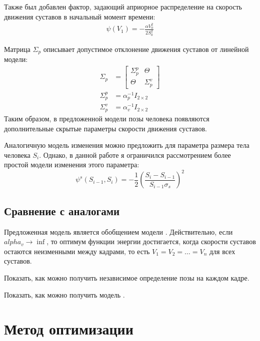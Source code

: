 Также был добавлен фактор, задающий априорное распределение на скорость движения суставов в начальный момент времени:
\begin{equation}
	\begin{aligned}
		\psi(V_1) = -\frac{\alpha V_0^2}{2 S_0^2}
	\end{aligned}
\end{equation}

Матрица $\Sigma_p$ описывает допустимое отклонение движения суставов от линейной модели:
\begin{equation}
	\begin{aligned}
		\Sigma_p &= \left[
			\begin{array}{c|c}
			\Sigma_p^p & \Theta \\ \hline
			\Theta     & \Sigma_p^v
			\end{array}
			\right] \\
		\Sigma_p^p &= \alpha_p^{-1} I_{2\times2} \\
		\Sigma_p^v &= \alpha_v^{-1} I_{2\times2}
	\end{aligned}
\end{equation}
Таким образом, в предложенной модели позы человека появляются дополнительные скрытые параметры скорости движения суставов.

Аналогичную модель изменения можно предложить для параметра размера тела человека $S_i$. Однако, в данной работе я ограничился рассмотрением более простой модели изменения этого параметра:
\begin{equation}
	\psi^s(S_{i-1}, S_i) = -\frac{1}{2} \left(\frac{S_i - S_{i-1}}{S_{i-1}\sigma_s}\right)^2
\end{equation}

\subsection{Сравнение с аналогами}

Предложенная модель является обобщением модели \cite{park2011n}. Действительно, если $alpha_v \rightarrow \inf$, то оптимум функции энергии достигается, когда скорости суставов остаются неизменными между кадрами, то есть $V_1 = V_2 = \dots = V_n$ для всех суставов.

Показать, как можно получить независимое определение позы на каждом кадре.

Показать, как можно получить модель \cite{park2011n}.

\section{Метод оптимизации}

